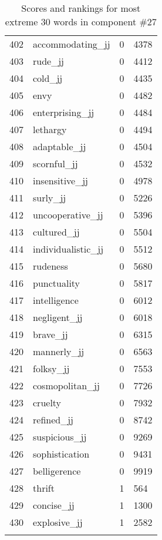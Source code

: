 \begin{longtable}[!htbp]{| rlr@{.}l |}
    402 & accommodating\_jj & 0 & 4378 \\
    403 & rude\_jj & 0 & 4412 \\
    404 & cold\_jj & 0 & 4435 \\
    405 & envy & 0 & 4482 \\
    406 & enterprising\_jj & 0 & 4484 \\
    407 & lethargy & 0 & 4494 \\
    408 & adaptable\_jj & 0 & 4504 \\
    409 & scornful\_jj & 0 & 4532 \\
    410 & insensitive\_jj & 0 & 4978 \\
    411 & surly\_jj & 0 & 5226 \\
    412 & uncooperative\_jj & 0 & 5396 \\
    413 & cultured\_jj & 0 & 5504 \\
    414 & individualistic\_jj & 0 & 5512 \\
    415 & rudeness & 0 & 5680 \\
    416 & punctuality & 0 & 5817 \\
    417 & intelligence & 0 & 6012 \\
    418 & negligent\_jj & 0 & 6018 \\
    419 & brave\_jj & 0 & 6315 \\
    420 & mannerly\_jj & 0 & 6563 \\
    421 & folksy\_jj & 0 & 7553 \\
    422 & cosmopolitan\_jj & 0 & 7726 \\
    423 & cruelty & 0 & 7932 \\
    424 & refined\_jj & 0 & 8742 \\
    425 & suspicious\_jj & 0 & 9269 \\
    426 & sophistication & 0 & 9431 \\
    427 & belligerence & 0 & 9919 \\
    428 & thrift & 1 & 564 \\
    429 & concise\_jj & 1 & 1300 \\
    430 & explosive\_jj & 1 & 2582 \\
    \hline
    \caption{Scores and rankings for most extreme 30 words in component \#27} \\
\end{longtable}
